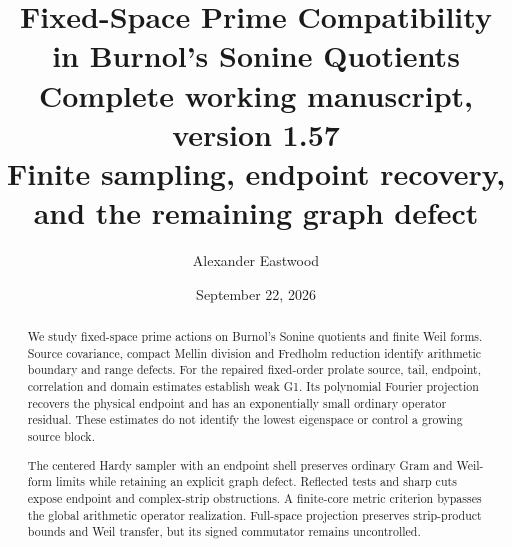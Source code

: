 \documentclass[11pt]{article}
\title{\textbf{Fixed-Space Prime Compatibility in Burnol's Sonine Quotients}\\[5pt]
\large Complete working manuscript, version 1.57\\
\normalsize Finite sampling, endpoint recovery, and the remaining graph defect}
\author{Alexander Eastwood}
\date{September 22, 2026}
\theoremstyle{remark}
\begin{document}
\maketitle
\begin{abstract}
We study fixed-space prime actions on Burnol's Sonine quotients and
finite Weil forms. Source covariance, compact Mellin division and
Fredholm reduction identify arithmetic boundary and range defects.
For the repaired fixed-order prolate source, tail, endpoint, correlation
and domain estimates establish weak G1. Its polynomial Fourier
projection recovers the physical endpoint and has an exponentially
small ordinary operator residual. These estimates do not identify
the lowest eigenspace or control a growing source block.

The centered Hardy sampler with an endpoint shell preserves ordinary
Gram and Weil-form limits while retaining an explicit graph defect.
Reflected tests and sharp cuts expose endpoint and complex-strip
obstructions. A finite-core metric criterion bypasses the global
arithmetic operator realization. Full-space projection preserves
strip-product bounds and Weil transfer, but its signed commutator
remains uncontrolled.


\end{abstract}
\end{document}
